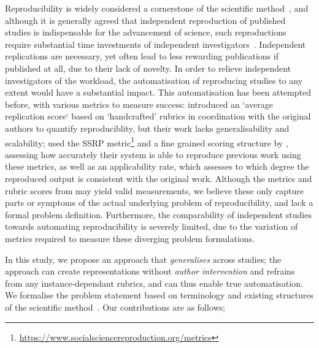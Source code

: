 \documentclass[letterpaper]{article} %
\begin{document}
Reproducibility is widely considered a cornerstone of the scientific method~\cite{fidler2025reproducibility}, and although it is generally agreed that independent reproduction of published studies is indispensable for the advancement of science, such reproductions require substantial time investments of independent investigators~\cite{raff2019quantifying, Gundersen_Cappelen_Mølnå_Nilsen_2025}. Independent replications are necessary, yet often lead to less rewarding publications if published at all, due to their lack of novelty. In order to relieve independent investigators of the workload, the automatisation of reproducing studies to any extent would have a substantial impact. This automatisation has been attempted before, with various metrics to measure success: \citet{starace_paperbench_2025} introduced an `average replication score` based on `handcrafted' rubrics in coordination with the original authors to quantify reproduciblity, but their work lacks generalisability and scalability; \citet{hu2025repro} used the SSRP metric\footnote{\href{https://www.socialsciencereproduction.org/metrics}{https://www.socialsciencereproduction.org/metrics}} and a fine grained scoring structure by \citet{brodeur2024mass}, assessing how accurately their system is able to reproduce previous work using these metrics, as well as an applicability rate, which assesses to which degree the reproduced output is consistent with the original work. Although the metrics and rubric scores from \cite{starace_paperbench_2025, brodeur2024mass} may yield valid measurements, we believe these only capture parts or symptoms of the actual underlying problem of reproducibility, and lack a formal problem definition. Furthermore, the comparability of independent studies towards automating reproducibility is severely limited, due to the variation of metrics required to measure these diverging problem formulations.


In this study, we propose an approach that \emph{generalises} across studies; the approach can create representations without \emph{author intervention} and refrains from any instance-dependant rubrics, and can thus enable true automatisation. We formalise the problem statement based on terminology and existing structures of the scientific method~\cite{popper1934logic}. Our contributions are as follows;
\end{document}
